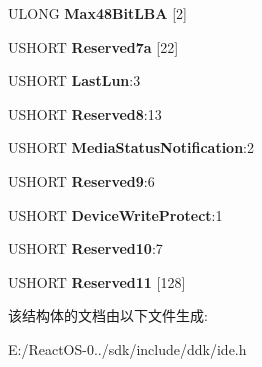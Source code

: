\begin{DoxyCompactItemize}
U\+L\+O\+NG {\bfseries Max48\+Bit\+L\+BA} \mbox{[}2\mbox{]}
\item 
\mbox{\label{struct___e_x_t_e_n_d_e_d___i_d_e_n_t_i_f_y___d_a_t_a_a26fc9d3d623a61033b7a1f7ba5d0f992}} 
U\+S\+H\+O\+RT {\bfseries Reserved7a} \mbox{[}22\mbox{]}
\item 
\mbox{\label{struct___e_x_t_e_n_d_e_d___i_d_e_n_t_i_f_y___d_a_t_a_a14387128c42fef4b1a2ea17fcb260e26}} 
U\+S\+H\+O\+RT {\bfseries Last\+Lun}\+:3
\item 
\mbox{\label{struct___e_x_t_e_n_d_e_d___i_d_e_n_t_i_f_y___d_a_t_a_a36f755486fad4a5f462c85e88ac42a66}} 
U\+S\+H\+O\+RT {\bfseries Reserved8}\+:13
\item 
\mbox{\label{struct___e_x_t_e_n_d_e_d___i_d_e_n_t_i_f_y___d_a_t_a_a59c9b737e72e179d48dad7d6afa3b35e}} 
U\+S\+H\+O\+RT {\bfseries Media\+Status\+Notification}\+:2
\item 
\mbox{\label{struct___e_x_t_e_n_d_e_d___i_d_e_n_t_i_f_y___d_a_t_a_abeeeaaa824381fa02c59df4dc7df2f2a}} 
U\+S\+H\+O\+RT {\bfseries Reserved9}\+:6
\item 
\mbox{\label{struct___e_x_t_e_n_d_e_d___i_d_e_n_t_i_f_y___d_a_t_a_a07d09bbcba68c5a02365d7182fbbdab9}} 
U\+S\+H\+O\+RT {\bfseries Device\+Write\+Protect}\+:1
\item 
\mbox{\label{struct___e_x_t_e_n_d_e_d___i_d_e_n_t_i_f_y___d_a_t_a_abe0c767afdea35f0405554af436889b6}} 
U\+S\+H\+O\+RT {\bfseries Reserved10}\+:7
\item 
\mbox{\label{struct___e_x_t_e_n_d_e_d___i_d_e_n_t_i_f_y___d_a_t_a_a06c49181fb4dad2d0262bd17aead4a34}} 
U\+S\+H\+O\+RT {\bfseries Reserved11} \mbox{[}128\mbox{]}
\end{DoxyCompactItemize}


该结构体的文档由以下文件生成\+:\begin{DoxyCompactItemize}
\item 
E\+:/\+React\+O\+S-\/0../sdk/include/ddk/ide.\+h\end{DoxyCompactItemize}
